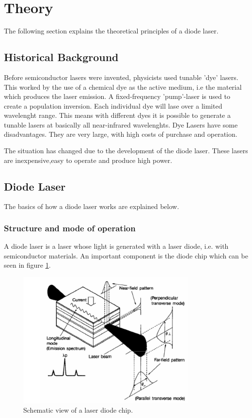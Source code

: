 \section{Theory}
\label{sec:theory}

The following section explains the theoretical principles of a diode laser.

\subsection{Historical Background}
\label{sec:Historical Background}

Before semiconductor lasers were invented, physicists used tunable 'dye' lasers.
This worked by the use of a chemical dye as the active medium, i.e the material which produces the laser emission.
A fixed-frequency 'pump'-laser is used to create a population inversion. Each individual dye will lase over a limited wavelenght range.
This means with different dyes it is possible to generate a tunable lasers at basically all near-infrared wavelenghts.
Dye Lasers have some disadvantages. They are very large, with high costs of purchase and operation.

The situation has changed due to the development of the diode laser. These lasers are inexpensive,easy to operate and produce high power.

\subsection{Diode Laser}
\label{sec:Diode Laser}

The basics of how a diode laser works are explained below.

\subsubsection{Structure and mode of operation}
\label{Structure and mode of operation}

A diode laser is a laser whose light is generated with a laser diode, i.e. with semiconductor materials.
An important component is the diode chip which can be seen in figure \ref{fig:diodechip}.

\begin{figure}[H]
    \centering
    \includegraphics[width=0.8\textwidth]{content/graphics/laserdiodechip.jpg}
    \caption{Schematic view of a laser diode chip.} %
    \label{fig:diodechip}
\end{figure}

